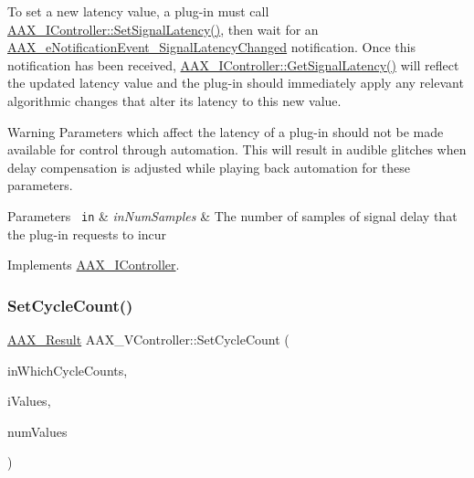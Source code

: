 To set a new latency value, a plug-\/in must call \mbox{\hyperlink{a01789_af2c648879419d94971c1308d8698601f}{A\+A\+X\+\_\+\+I\+Controller\+::\+Set\+Signal\+Latency()}}, then wait for an \mbox{\hyperlink{a00491_afab5ea2cfd731fc8f163b6caa685406ea06ab4b075ecb523d0dde3ec19b76a756}{A\+A\+X\+\_\+e\+Notification\+Event\+\_\+\+Signal\+Latency\+Changed}} notification. Once this notification has been received, \mbox{\hyperlink{a01789_ad50aa6fd54e39623a58debd63d9551e1}{A\+A\+X\+\_\+\+I\+Controller\+::\+Get\+Signal\+Latency()}} will reflect the updated latency value and the plug-\/in should immediately apply any relevant algorithmic changes that alter its latency to this new value.

\begin{DoxyWarning}{Warning}
Parameters which affect the latency of a plug-\/in should not be made available for control through automation. This will result in audible glitches when delay compensation is adjusted while playing back automation for these parameters.
\end{DoxyWarning}

\begin{DoxyParams}[1]{Parameters}
\mbox{\texttt{ in}}  & {\em in\+Num\+Samples} & The number of samples of signal delay that the plug-\/in requests to incur \\
\hline
\end{DoxyParams}


Implements \mbox{\hyperlink{a01789_af2c648879419d94971c1308d8698601f}{A\+A\+X\+\_\+\+I\+Controller}}.

\mbox{\label{a01905_ab0cd458b66e319fd14c2f1a17c7b678f}} 
\subsubsection{\texorpdfstring{SetCycleCount()}{SetCycleCount()}}
{\footnotesize\ttfamily \mbox{\hyperlink{a00392_a4d8f69a697df7f70c3a8e9b8ee130d2f}{A\+A\+X\+\_\+\+Result}} A\+A\+X\+\_\+\+V\+Controller\+::\+Set\+Cycle\+Count (\begin{DoxyParamCaption}\item[{\mbox{\hyperlink{a00662_a13e384f22825afd3db6d68395b79ce0d}{A\+A\+X\+\_\+\+E\+Property}} $\ast$}]{in\+Which\+Cycle\+Counts,  }\item[{\mbox{\hyperlink{a00392_ab247c0d8686c14e05cbb567ef276f249}{A\+A\+X\+\_\+\+C\+Property\+Value}} $\ast$}]{i\+Values,  }\item[{int32\+\_\+t}]{num\+Values }\end{DoxyParamCaption})\hspace{0.3cm}{\ttfamily [virtual]}}



